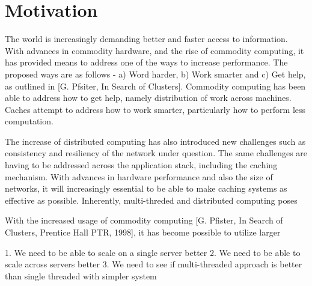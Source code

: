 \section{Motivation}

The world is increasingly demanding better and faster access to information. With advances in commodity hardware, and the rise of commodity computing, it has provided means to address one of the ways to increase performance. The proposed ways are as follows - a) Word harder, b) Work smarter and c) Get help, as outlined in [G. Pfsiter, In Search of Clusters]. Commodity computing has been able to address how to get help, namely distribution of work across machines. Caches attempt to address how to work smarter, particularly how to perform less computation.

The increase of distributed computing has also introduced new challenges such as consistency and resiliency of the network under question. The same challenges are having to be addressed across the application stack, including the caching mechanism. With advances in hardware performance and also the size of networks, it will increasingly essential to be able to make caching systems as effective as possible. Inherently, multi-threded and distributed computing poses


With the increased usage of commodity computing [G. Pfister, In Search of Clusters, Prentice Hall PTR, 1998], it has become possible to utilize larger



1. We need to be able to scale on a single server better
2. We need to be able to scale across servers better
3. We need to see if multi-threaded approach is better than single threaded with simpler system
